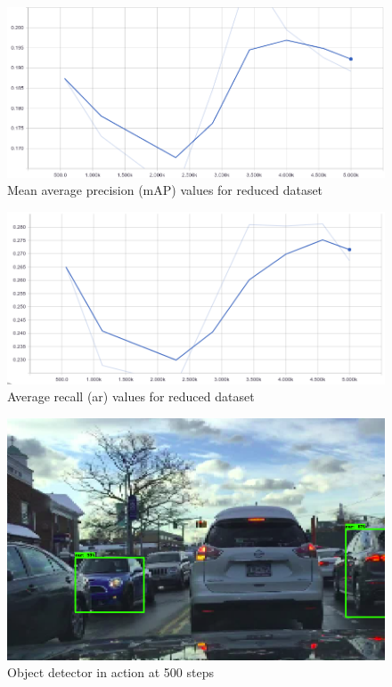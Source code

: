 \documentclass[12pt]{report}
\begin{document}
\vspace{0.5cm}
\begin{figure}[h]
	\centering
	\includegraphics[width=12cm]{map-smalldata-5k}
	\caption{Mean average precision (mAP) values for reduced dataset}
	\label{fig:map-smalldata-5k}
\end{figure}

\vspace{0.5cm}
\begin{figure}[h]
	\centering
	\includegraphics[width=12cm]{ar-smalldata-5k}
	\caption{Average recall (ar) values for reduced dataset}
	\label{fig:ar-smalldata-5k}
\end{figure}

\vspace{0.5cm}
\begin{figure}[h]
	\centering
	\includegraphics[width=15cm]{class-smalldata-500}
	\caption{Object detector in action at 500 steps}
	\label{fig:class-smalldata-500}
\end{figure}
\end{document}
